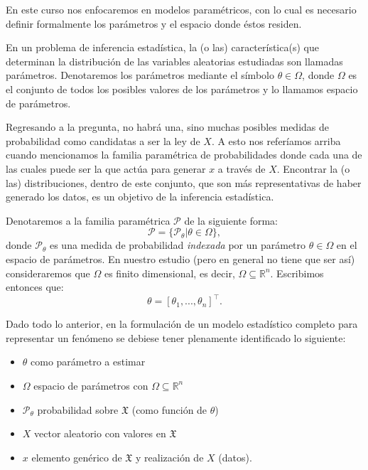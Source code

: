 En este curso nos enfocaremos en modelos paramétricos, con lo cual es necesario definir formalmente los parámetros y el espacio donde éstos residen.

\begin{definition} 
En un problema de inferencia estadística, la (o las) característica(s) que determinan la distribución de las variables aleatorias estudiadas son llamadas parámetros. Denotaremos los parámetros mediante el símbolo $\theta\in\Omega$, donde $\Omega$ es el conjunto de todos los posibles valores de los parámetros y lo llamamos espacio de parámetros.
\end{definition}

Regresando a la pregunta, no habrá una, sino muchas posibles medidas de probabilidad como candidatas a ser la ley de ${X}$. A esto nos referíamos arriba cuando mencionamos la familia paramétrica de probabilidades donde cada una de las cuales puede ser la que actúa para generar $x$ a través de ${X}$. Encontrar la (o las) distribuciones, dentro de este conjunto, que son más representativas de haber generado los datos, es un objetivo de la inferencia estadística. 

Denotaremos a la familia paramétrica $\mathcal{P}$ de la siguiente forma:
\[\mathcal{P} = \{\mathcal{P}_\theta | \theta \in \Omega \},\]
donde $\mathcal{P}_\theta $ es una medida de probabilidad \emph{indexada} por un parámetro $\theta \in \Omega$ en el espacio de parámetros. En nuestro estudio (pero en general no tiene que ser así) consideraremos que $\Omega$ es finito dimensional, es decir, $\Omega \subseteq \mathbb{R}^n$. Escribimos entonces que:
\[\theta = [\theta_1, ..., \theta_n]^\top. \]


Dado todo lo anterior, en la formulación de un modelo estadístico completo para representar un fenómeno se debiese tener plenamente identificado lo siguiente:

\begin{itemize}
    \item $\theta$ como parámetro a estimar
    \item $\Omega$ espacio de parámetros con $\Omega \subseteq \mathbb{R}^n$
    \item $\mathcal{P}_\theta$ probabilidad sobre $\mathfrak{X}$ (como función de $\theta$)
    \item ${X}$ vector aleatorio con valores en $\mathfrak{X}$
    \item $x$ elemento genérico de $\mathfrak{X}$ y realización de $X$ (datos).
\end{itemize}


